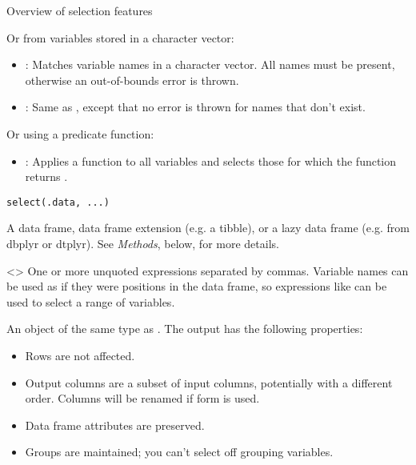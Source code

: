 \documentclass[a4paper]{book}
\begin{document}
\begin{Description}
\begin{SubSection}{Overview of selection features}
\begin{itemize}
\end{itemize}


Or from variables stored in a character vector:
\begin{itemize}

\item{} : Matches variable names in a character vector. All
names must be present, otherwise an out-of-bounds error is
thrown.
\item{} : Same as , except that no error is thrown
for names that don't exist.

\end{itemize}


Or using a predicate function:
\begin{itemize}

\item{} : Applies a function to all variables and selects those
for which the function returns .

\end{itemize}

\end{SubSection}

\end{Description}
%
\begin{Usage}
\begin{verbatim}
select(.data, ...)
\end{verbatim}
\end{Usage}
%
\begin{Arguments}
\begin{ldescription}
\item[\code{.data}] A data frame, data frame extension (e.g. a tibble), or a
lazy data frame (e.g. from dbplyr or dtplyr). See \emph{Methods}, below, for
more details.

\item[\code{...}] <> One or more unquoted
expressions separated by commas. Variable names can be used as if they
were positions in the data frame, so expressions like  can
be used to select a range of variables.
\end{ldescription}
\end{Arguments}
%
\begin{Value}
An object of the same type as . The output has the following
properties:
\begin{itemize}

\item{} Rows are not affected.
\item{} Output columns are a subset of input columns, potentially with a different
order. Columns will be renamed if  form is used.
\item{} Data frame attributes are preserved.
\item{} Groups are maintained; you can't select off grouping variables.

\end{itemize}

\end{Value}
\end{document}
